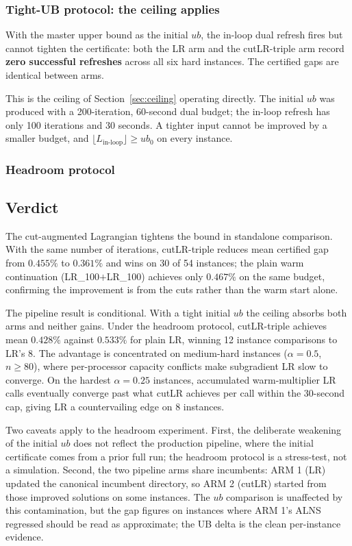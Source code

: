\documentclass[11pt,a4paper]{article}
\begin{document}
\subsubsection{Tight-UB protocol: the ceiling applies}

With the master upper bound as the initial $ub$, the in-loop dual refresh fires
but cannot tighten the certificate: both the LR arm and the cutLR-triple arm
record \textbf{zero successful refreshes} across all six hard instances.  The
certified gaps are identical between arms.

This is the ceiling of Section~\ref{sec:ceiling} operating directly.  The
initial $ub$ was produced with a 200-iteration, 60-second dual budget; the
in-loop refresh has only 100 iterations and 30 seconds.  A tighter input cannot
be improved by a smaller budget, and $\lfloor L_{\text{in-loop}}\rfloor\ge ub_0$
on every instance.

\subsubsection{Headroom protocol}



\subsection{Verdict}\label{sec:cutlr-verdict}

The cut-augmented Lagrangian tightens the bound in standalone
comparison.  With the same number of iterations, cutLR-triple reduces mean certified gap
from $0.455\%$ to $0.361\%$ and wins on 30 of 54 instances; the plain warm
continuation (LR\_100$+$LR\_100) achieves only $0.467\%$ on the same budget,
confirming the improvement is from the cuts rather than the warm start alone.

The pipeline result is conditional.  With a tight initial $ub$ the ceiling
absorbs both arms and neither gains.  Under the headroom protocol, cutLR-triple
achieves mean $0.428\%$ against $0.533\%$ for plain LR, winning 12 instance
comparisons to LR's 8.  The advantage is concentrated on medium-hard instances
($\alpha=0.5$, $n\ge 80$), where per-processor capacity conflicts make
subgradient LR slow to converge.  On the hardest $\alpha=0.25$ instances,
accumulated warm-multiplier LR calls eventually converge past what cutLR
achieves per call within the 30-second cap, giving LR a countervailing edge on
8 instances.

Two caveats apply to the headroom experiment.  First, the deliberate weakening
of the initial $ub$ does not reflect the production pipeline, where the initial
certificate comes from a prior full run; the headroom protocol is a
stress-test, not a simulation.  Second, the two pipeline arms share incumbents:
ARM 1 (LR) updated the canonical incumbent directory, so ARM 2 (cutLR) started
from those improved solutions on some instances.  The $ub$ comparison is
unaffected by this contamination, but the gap figures on instances where ARM 1's
ALNS regressed should be read as approximate; the UB delta is the clean
per-instance evidence.
\end{document}
